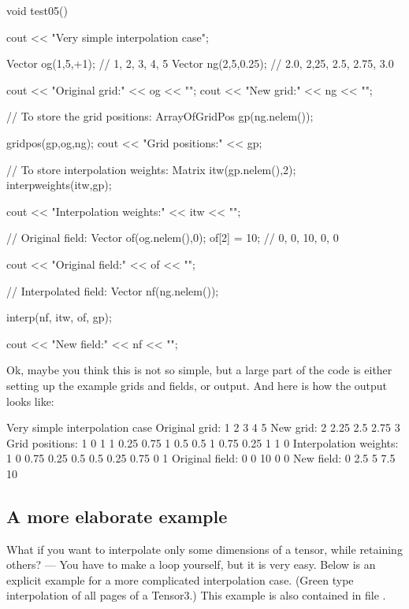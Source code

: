 \begin{code}
void test05()
{
  cout << "Very simple interpolation case\n";

  Vector og(1,5,+1);            // 1, 2, 3, 4, 5
  Vector ng(2,5,0.25);          // 2.0, 2,25, 2.5, 2.75, 3.0

  cout << "Original grid:\n" << og << "\n";
  cout << "New grid:\n" << ng << "\n";

  // To store the grid positions:
  ArrayOfGridPos gp(ng.nelem());

  gridpos(gp,og,ng);
  cout << "Grid positions:\n" << gp;

  // To store interpolation weights:
  Matrix itw(gp.nelem(),2);
  interpweights(itw,gp);
    
  cout << "Interpolation weights:\n" << itw << "\n";

  // Original field:
  Vector of(og.nelem(),0);
  of[2] = 10;                   // 0, 0, 10, 0, 0

  cout << "Original field:\n" << of << "\n";

  // Interpolated field:
  Vector nf(ng.nelem());

  interp(nf, itw, of, gp);

  cout << "New field:\n" << nf << "\n";
}
\end{code}

\hspace{-\parindent}Ok, maybe you think this is not so simple, but a
large part of the code is either setting up the example grids and
fields, or output. And here is how the output looks like:

\begin{code}
Very simple interpolation case
Original grid:
  1   2   3   4   5
New grid:
  2 2.25 2.5 2.75   3
Grid positions:
   1 0    1
   1 0.25 0.75
   1 0.5  0.5
   1 0.75 0.25
   1 1    0
Interpolation weights:
  1   0
0.75 0.25
0.5 0.5
0.25 0.75
  0   1
Original field:
  0   0  10   0   0
New field:
  0 2.5   5 7.5  10
\end{code}

\subsection{A more elaborate example}

What if you want to interpolate only some dimensions of a tensor,
while retaining others? --- You have to make a loop yourself, but it
is very easy. Below is an explicit example for a more complicated
interpolation case. (Green type interpolation of all pages of a
Tensor3.) This example is also contained in file
.

